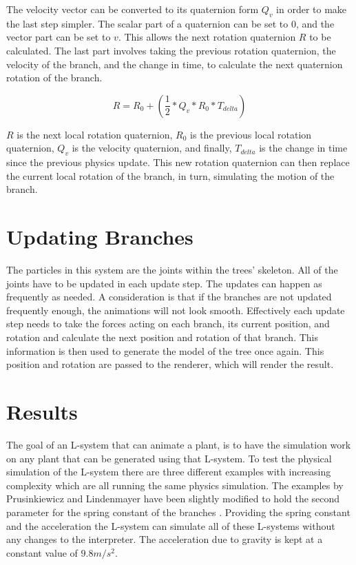 \noindent
The velocity vector can be converted to its quaternion form $Q_v$ in order to make the last step simpler. The scalar part of a quaternion can be set to 0, and the vector part can be set to $v$. This allows the next rotation quaternion $R$ to be calculated. The last part involves taking the previous rotation quaternion, the velocity of the branch, and the change in time, to calculate the next quaternion rotation of the branch.

\begin{equation}
R = R_0 + (\frac{1}{2} * Q_v * R_0 * T_{delta})
\end{equation}

\noindent
$R$ is the next local rotation quaternion, $R_0$ is the previous local rotation quaternion, $Q_v$ is the velocity quaternion, and finally, $T_{delta}$ is the change in time since the previous physics update. This new rotation quaternion can then replace the current local rotation of the branch, in turn, simulating the motion of the branch.

\section{Updating Branches}

The particles in this system are the joints within the trees' skeleton. All of the joints have to be updated in each update step. The updates can happen as frequently as needed. A consideration is that if the branches are not updated frequently enough, the animations will not look smooth. Effectively each update step needs to take the forces acting on each branch, its current position, and rotation and calculate the next position and rotation of that branch. This information is then used to generate the model of the tree once again. This position and rotation are passed to the renderer, which will render the result.

\section{Results}

The goal of an L-system that can animate a plant, is to have the simulation work on any plant that can be generated using that L-system. To test the physical simulation of the L-system there are three different examples with increasing complexity which are all running the same physics simulation. The examples by Prusinkiewicz and Lindenmayer have been slightly modified to hold the second parameter for the spring constant of the branches \cite{prusinkiewicz2012algorithmic}. Providing the spring constant and the acceleration the L-system can simulate all of these L-systems without any changes to the interpreter. The acceleration due to gravity is kept at a constant value of $9.8m/s^2$.

